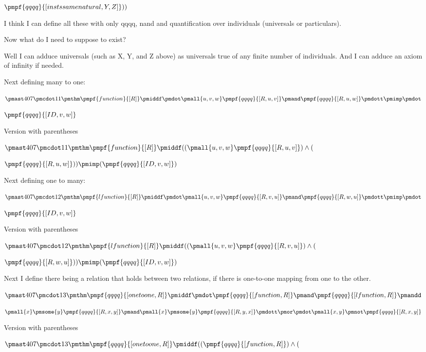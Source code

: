 \documentclass[12pt]{article}
\begin{document}
$\pmpf{qqqq}{[instssamenatural, Y, Z]}))$


I think I can define all these with only qqqq, nand and quantification over individuals (universals or particulars).

Now what do I need to suppose to exist?

Well I can adduce universals (such as X, Y, and Z above) as universals true of any finite number of individuals. And I can adduce an axiom of infinity if needed.

Next defining many to one:

$\pmast 407 \pmcdot 11 \pmthm \pmpf{function}{[R]} \pmiddf \pmdot \pmall{u,v,w} \pmpf{qqqq}{[R, u, v]} \pmand \pmpf{qqqq}{[R, u, w]} \pmdott \pmimp \pmdot $

$\pmpf{qqqq}{[ID, v, w]} $
 
 

Version with parentheses

$\pmast 407 \pmcdot 11 \pmthm \pmpf{function}{[R]} \pmiddf  ((  \pmall{u,v,w} \pmpf{qqqq}{[R, u, v]} ) \land ( $

$\pmpf{qqqq}{[R, u, w]}  )) \pmimp (  \pmpf{qqqq}{[ID, v, w]} )$


Next defining one to many:

$\pmast 407 \pmcdot 12 \pmthm \pmpf{lfunction}{[R]} \pmiddf \pmdot \pmall{u,v,w} \pmpf{qqqq}{[R, v, u]} \pmand \pmpf{qqqq}{[R, w, u]} \pmdott \pmimp \pmdot $

$\pmpf{qqqq}{[ID, v, w]} $
 
 

Version with parentheses

$\pmast 407 \pmcdot 12 \pmthm \pmpf{lfunction}{[R]} \pmiddf  ((  \pmall{u,v,w} \pmpf{qqqq}{[R, v, u]} ) \land ( $

$\pmpf{qqqq}{[R, w, u]}  )) \pmimp (  \pmpf{qqqq}{[ID, v, w]} )$


Next I define there being a relation that holds between two relations, if there is one-to-one mapping from one to the other.

$\pmast 407 \pmcdot 13 \pmthm \pmpf{qqqq}{[onetoone,R]} \pmiddf \pmdot \pmpf{qqqq}{[function, R]} \pmand \pmpf{qqqq}{[lfunction, R]} \pmandd $

$\pmall{x} \pmsome{y} \pmpf{qqqq}{[R,x,y]} \pmand \pmall{x} \pmsome{y} \pmpf{qqqq}{[R,y,x]} \pmdott \pmor \pmdot \pmall{x,y} \pmnot \pmpf{qqqq}{[R,x,y]}$
 
 

Version with parentheses

$\pmast 407 \pmcdot 13 \pmthm \pmpf{qqqq}{[onetoone,R]} \pmiddf  ((  \pmpf{qqqq}{[function, R]} ) \land ( $
\end{document}

